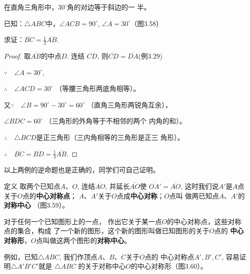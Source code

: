 \begin{example}
    在直角三角形中，$30^{\circ}$角的对边等于斜边的一
半。
\end{example}

已知：$\triangle ABC$中，$\angle ACB=90^{\circ}$, $\angle A=30^{\circ}$（图3.58）

求证：$\overline{BC}=\frac{1}{2}\overline{AB}$.

\begin{proof}
    取$\overline{AB}$的中点$D$. 连结
    $\overline{CD}$, 则$\overline{CD}=\overline{DA}$(例3.29)

$\because\quad \angle A=30^{\circ}$,

$\therefore\quad \angle ACD=30^{\circ}$ （等腰三角形两底角相等）。

又$\because\quad \angle B=90^{\circ} -30^{\circ} =60^{\circ}$ （直角三角形两锐角互余），

$ \angle BDC=60^{\circ}$ （三角形的外角等于不相邻的两个
    内角的和）。

$\therefore\quad \triangle BCD$是正三角形（三内角相等的三角形是正三
    角形）。

$\therefore\quad  \overline{BC}= \overline{BD}=\frac{1}{3} \overline{AB}$.
 \end{proof}

以上两例的逆命题也是正确的，同学们可自己证明。   
    
\begin{blk}
   {定义} 取两个已知点$A$、$O$, 连结$\overline{AO}$, 并延长$\overline{AO}$使
$\overline{OA'}=\overline{AO}$, 这时我们说$A'$是$A$点关于$O$点的\textbf{中心对称点}；
$A$、$A'$关于$O$点成\textbf{中心对称}；$O$点叫
做两已知点$A$、$A'$的\textbf{对称中心}
（图3.59）。 
\end{blk}

\begin{figure}[htp]
    \centering
    \caption{}
\end{figure}

对于任何一个已知图形上的一点，
作出它关于某一点$O$的中心对称点，这些对称点的集合，构成
了一个新的图形，这个新的图形叫做已知图形的关于$O$点的
\textbf{中心对称形}，$O$点叫做这两个图形的\textbf{对称中心}。

例如，已知$\triangle ABC$, 我们作顶点$A$、$B$、$C$关于$O$点的
中心对称点$A',B',C'$, 容易证明$\triangle A'B'C'$就是
$\triangle ABC$
的关于对称中心$O$的中心对称形（图3.60）。


